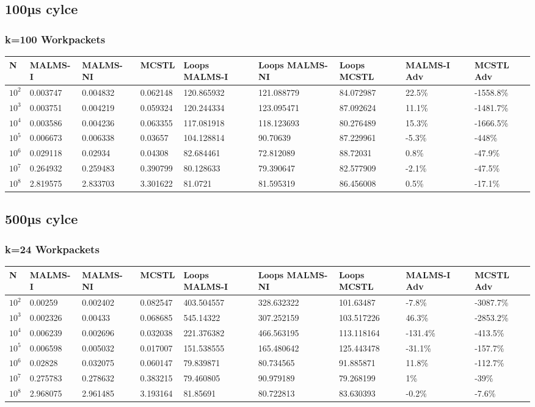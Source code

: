 \documentclass[landscape]{article}
\begin{document}
\subsection*{100µs cylce}
\subsubsection{k=100 Workpackets}
\begin{tabular}{l|l|l|l|l|l|l|l|l}
N	& MALMS-I 	& MALMS-NI	& MCSTL		& Loops MALMS-I	& Loops MALMS-NI & Loops MCSTL & MALMS-I Adv	& MCSTL Adv		\\
\hline
$10^2$		& 0.003747	& 0.004832	& 0.062148	& 120.865932	& 121.088779	& 84.072987	& 22.5\%  	& -1558.8\% \\
$10^3$		& 0.003751	& 0.004219	& 0.059324	& 120.244334	& 123.095471	& 87.092624	& 11.1\%  	& -1481.7\% \\
$10^4$		& 0.003586	& 0.004236	& 0.063355	& 117.081918	& 118.123693	& 80.276489	& 15.3\%  	& -1666.5\% \\
$10^5$		& 0.006673	& 0.006338	& 0.03657	& 104.128814	& 90.70639	& 87.229961	& -5.3\%  	& -448\% \\
$10^6$		& 0.029118	& 0.02934	& 0.04308	& 82.684461	& 72.812089	& 88.72031	& 0.8\%  	& -47.9\% \\
$10^7$		& 0.264932	& 0.259483	& 0.390799	& 80.128633	& 79.390647	& 82.577909	& -2.1\%  	& -47.5\% \\
$10^8$		& 2.819575	& 2.833703	& 3.301622	& 81.0721	& 81.595319	& 86.456008	& 0.5\%  	& -17.1\% \\
\end{tabular}
\subsection*{500µs cylce}
\subsubsection{k=24 Workpackets}
\begin{tabular}{l|l|l|l|l|l|l|l|l}
N	& MALMS-I 	& MALMS-NI	& MCSTL		& Loops MALMS-I	& Loops MALMS-NI & Loops MCSTL & MALMS-I Adv	& MCSTL Adv		\\
\hline
$10^2$		& 0.00259	& 0.002402	& 0.082547	& 403.504557	& 328.632322	& 101.63487	& -7.8\%  	& -3087.7\% \\
$10^3$		& 0.002326	& 0.00433	& 0.068685	& 545.14322	& 307.252159	& 103.517226	& 46.3\%  	& -2853.2\% \\
$10^4$		& 0.006239	& 0.002696	& 0.032038	& 221.376382	& 466.563195	& 113.118164	& -131.4\%  	& -413.5\% \\
$10^5$		& 0.006598	& 0.005032	& 0.017007	& 151.538555	& 165.480642	& 125.443478	& -31.1\%  	& -157.7\% \\
$10^6$		& 0.02828	& 0.032075	& 0.060147	& 79.839871	& 80.734565	& 91.885871	& 11.8\%  	& -112.7\% \\
$10^7$		& 0.275783	& 0.278632	& 0.383215	& 79.460805	& 90.979189	& 79.268199	& 1\%  	& -39\% \\
$10^8$		& 2.968075	& 2.961485	& 3.193164	& 81.85691	& 80.722813	& 83.630393	& -0.2\%  	& -7.6\% \\
\end{tabular}
\end{document}
